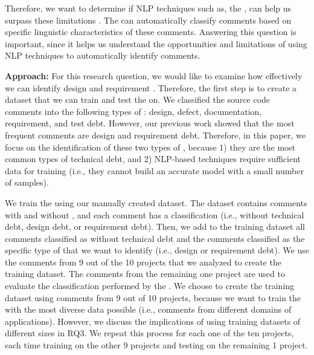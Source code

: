 Therefore, we want to determine if NLP techniques such as, the , can help us surpass these limitations . The  can automatically classify comments based on specific linguistic characteristics of these comments. Answering this question is important, since it helps us understand the opportunities and limitations of using NLP techniques to automatically identify \SATD comments. 

\vspace{1mm}
\noindent \textbf{Approach:} For this research question, we would like to examine how effectively we can identify design and requirement \SATD. Therefore, the first step is to create a dataset that we can train and test the  on. We classified the source code comments into the following types of \SATD: design, defect, documentation, requirement, and test debt. However, our previous work showed that the most frequent \SATD comments are design and requirement debt. Therefore, in this paper, we focus on the identification of these two types of \SATD, because 1) they are the most common types of technical debt, and 2) NLP-based techniques require sufficient data for training (i.e., they cannot build an accurate model with a small number of samples).

We train the  using our manually created dataset. The dataset contains comments with and without \SATD, and each comment has a classification (i.e., without technical debt, design debt, or requirement debt). Then, we add to the training dataset all comments classified as without technical debt and the comments classified as the specific type of \SATD that we want to identify (i.e., design or requirement debt). We use the comments from 9 out of the 10 projects that we analyzed to create the training dataset. The comments from the remaining one project are used to evaluate the classification performed by the . We choose to create the training dataset using comments from 9 out of 10 projects, because we want to train the  with the most diverse data possible (i.e., comments from different domains of applications). However, we discuss the implications of using training datasets of different sizes in RQ3. We repeat this process for each one of the ten projects, each time training on the other 9 projects and testing on the remaining 1 project.

